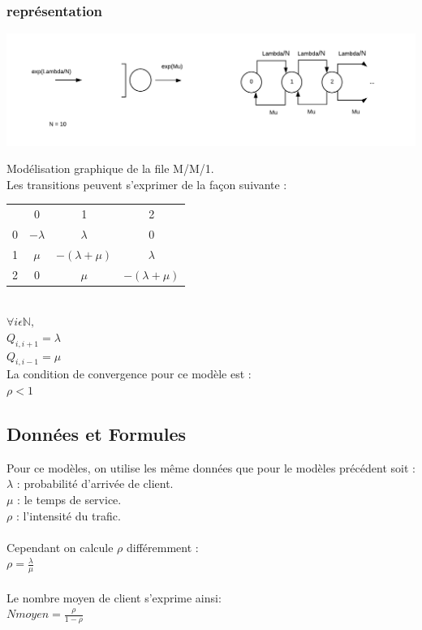 \documentclass[a4paper,11pt]{article}
\begin{document}
	\subsubsection{représentation}
	\centerline{\includegraphics[scale=0.5]{MM1.png}}
	Modélisation graphique de la file M/M/1.\\
	Les transitions peuvent s'exprimer de la façon suivante :\\
		\begin{tabular}{ | c | c | c | c |}
		\hline
		\ & 0          & 1                 & 2\\			
		0 & $-\lambda$ & $\lambda$         & 0\\
		1 & $\mu$      & $-(\lambda + \mu)$& $\lambda$\\
		2 & 0          & $\mu$             &  $-(\lambda + \mu)$\\
		\hline  
		\end{tabular}\\
		$\forall i \epsilon \pmb{\mathbb{N}},$\\
		$Q_{i, i+1} = \lambda$\\
		$Q_{i, i-1} = \mu$\\
		La condition de convergence pour ce modèle est :\\
		$\rho < 1$
	\subsection{Données et Formules}
	Pour ce modèles, on utilise les même données que pour le modèles précédent soit :\\
	$\lambda$ : probabilité d'arrivée de client.\\
	$\mu$ : le temps de service.\\
	$\rho$ : l'intensité du trafic.\\
	\\
	Cependant on calcule $\rho$ différemment :\\
	$\rho = \frac{\lambda}{\mu}$\\
	\\
	Le nombre moyen de client s'exprime ainsi:\\
	$Nmoyen = \frac{\rho}{1-\rho}$
\end{document}
